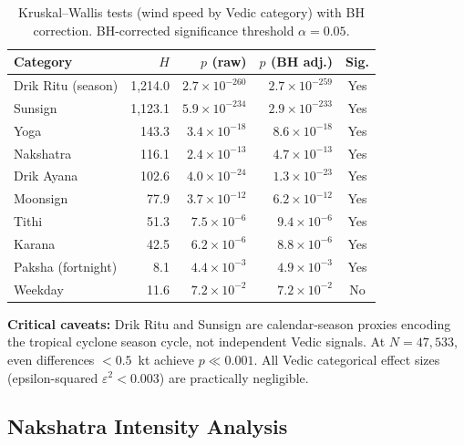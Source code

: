 \documentclass[12pt,a4paper]{article}
\begin{document}
    \begin{table}[H]
    \centering
    \caption{Kruskal--Wallis tests (wind speed by Vedic category) with BH
    correction. BH-corrected significance threshold $\alpha = 0.05$.}
    \label{tab:kw}
    \begin{tabular}{lrrrc}
        \toprule
        \textbf{Category} & \boldmath$H$ & \boldmath$p$ (raw) & \boldmath$p$ (BH adj.) & \textbf{Sig.} \\
        \midrule
        Drik Ritu (season) & 1{,}214.0 & $2.7\times10^{-260}$ & $2.7\times10^{-259}$ & Yes \\
        Sunsign            & 1{,}123.1 & $5.9\times10^{-234}$ & $2.9\times10^{-233}$ & Yes \\
        Yoga               & 143.3     & $3.4\times10^{-18}$  & $8.6\times10^{-18}$  & Yes \\
        Nakshatra          & 116.1     & $2.4\times10^{-13}$  & $4.7\times10^{-13}$  & Yes \\
        Drik Ayana         & 102.6     & $4.0\times10^{-24}$  & $1.3\times10^{-23}$  & Yes \\
        Moonsign           & 77.9      & $3.7\times10^{-12}$  & $6.2\times10^{-12}$  & Yes \\
        Tithi              & 51.3      & $7.5\times10^{-6}$   & $9.4\times10^{-6}$   & Yes \\
        Karana             & 42.5      & $6.2\times10^{-6}$   & $8.8\times10^{-6}$   & Yes \\
        Paksha (fortnight) & 8.1       & $4.4\times10^{-3}$   & $4.9\times10^{-3}$   & Yes \\
        Weekday            & 11.6      & $7.2\times10^{-2}$   & $7.2\times10^{-2}$   & No  \\
        \bottomrule
    \end{tabular}
    \end{table}

    \textbf{Critical caveats:} Drik Ritu and Sunsign are calendar-season proxies
    encoding the tropical cyclone season cycle, not independent Vedic signals.
    At $N = 47{,}533$, even differences $< 0.5$~kt achieve $p \ll 0.001$. All
    Vedic categorical effect sizes (epsilon-squared $\varepsilon^2 < 0.003$) are
    practically negligible.

    \subsection{Nakshatra Intensity Analysis}
\end{document}
